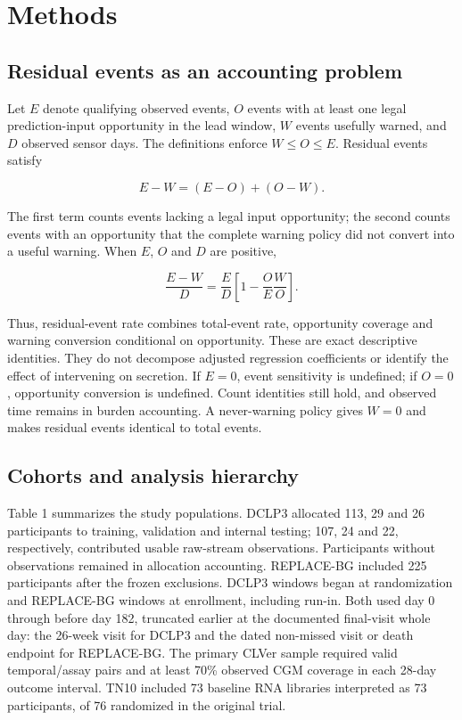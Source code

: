 \documentclass[
  american,
  11pt,
  letterpaper,
]{article}
\begin{document}
\section{Methods}\label{methods}

\subsection{Residual events as an accounting
problem}\label{residual-events-as-an-accounting-problem}

Let \(E\) denote qualifying observed events, \(O\) events with at least
one legal prediction-input opportunity in the lead window, \(W\) events
usefully warned, and \(D\) observed sensor days. The definitions enforce
\(W\leq O\leq E\). Residual events satisfy

\[
E-W=(E-O)+(O-W).
\]

The first term counts events lacking a legal input opportunity; the
second counts events with an opportunity that the complete warning
policy did not convert into a useful warning. When \(E\), \(O\) and
\(D\) are positive,

\[
\frac{E-W}{D}=\frac{E}{D}\left[1-\frac{O}{E}\frac{W}{O}\right].
\]

Thus, residual-event rate combines total-event rate, opportunity
coverage and warning conversion conditional on opportunity. These are
exact descriptive identities. They do not decompose adjusted regression
coefficients or identify the effect of intervening on secretion. If
\(E=0\), event sensitivity is undefined; if \(O=0\), opportunity
conversion is undefined. Count identities still hold, and observed time
remains in burden accounting. A never-warning policy gives \(W=0\) and
makes residual events identical to total events.

\subsection{Cohorts and analysis
hierarchy}\label{cohorts-and-analysis-hierarchy}

Table 1 summarizes the study populations. DCLP3 allocated 113, 29 and 26
participants to training, validation and internal testing; 107, 24 and
22, respectively, contributed usable raw-stream observations.
Participants without observations remained in allocation accounting.
REPLACE-BG included 225 participants after the frozen exclusions. DCLP3
windows began at randomization and REPLACE-BG windows at enrollment,
including run-in. Both used day 0 through before day 182, truncated
earlier at the documented final-visit whole day: the 26-week visit for
DCLP3 and the dated non-missed visit or death endpoint for REPLACE-BG.
The primary CLVer sample required valid temporal/assay pairs and at
least 70\% observed CGM coverage in each 28-day outcome interval. TN10
included 73 baseline RNA libraries interpreted as 73 participants, of 76
randomized in the original trial.
\end{document}

